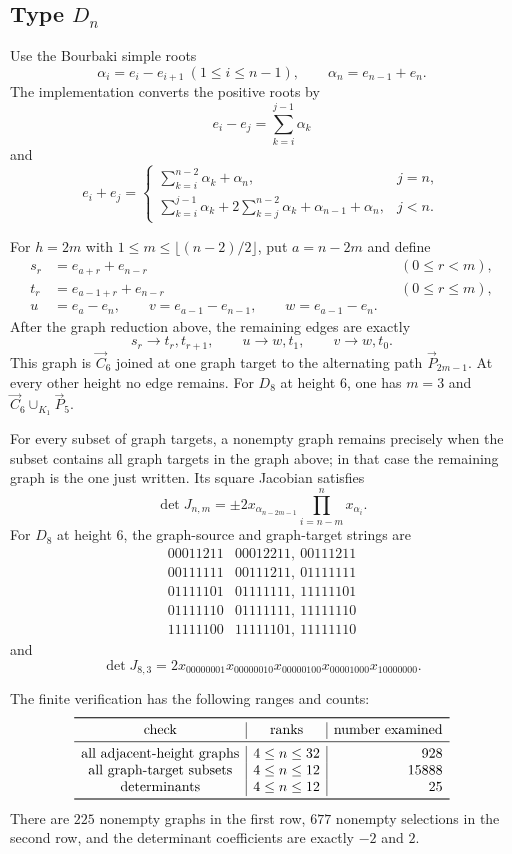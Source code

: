\documentclass[11pt]{amsart}
\begin{document}
\subsection{Type \texorpdfstring{$D_n$}{Dn}}

Use the Bourbaki simple roots
\[
\alpha_i=e_i-e_{i+1}\ (1\le i\le n-1),\qquad
\alpha_n=e_{n-1}+e_n.
\]
The implementation converts the positive roots by
\[
e_i-e_j=\sum_{k=i}^{j-1}\alpha_k
\]
and
\[
e_i+e_j=
\begin{cases}
\displaystyle\sum_{k=i}^{n-2}\alpha_k+\alpha_n,&j=n,\\[4pt]
\displaystyle\sum_{k=i}^{j-1}\alpha_k
+2\sum_{k=j}^{n-2}\alpha_k+\alpha_{n-1}+\alpha_n,&j<n.
\end{cases}
\]

For $h=2m$ with $1\le m\le\lfloor(n-2)/2\rfloor$, put $a=n-2m$ and define
\[
\begin{aligned}
s_r&=e_{a+r}+e_{n-r} &&(0\le r<m),\\
t_r&=e_{a-1+r}+e_{n-r} &&(0\le r\le m),\\
u&=e_a-e_n,\qquad
v=e_{a-1}-e_{n-1},\qquad
w=e_{a-1}-e_n.
\end{aligned}
\]
After the graph reduction above, the remaining edges are exactly
\[
s_r\longrightarrow t_r,t_{r+1},\qquad
u\longrightarrow w,t_1,\qquad
v\longrightarrow w,t_0.
\]
This graph is $\vec C_6$ joined at one graph target to the alternating path
$\vec P_{2m-1}$.  At every other height no edge remains.  For $D_8$ at height
$6$, one has $m=3$ and $\vec C_6\cup_{K_1}\vec P_5$.

For every subset of graph targets, a nonempty graph remains precisely when the
subset contains all graph targets in the graph above; in that case the
remaining graph is the one just written.  Its square Jacobian satisfies
\[
\det J_{n,m}=\pm2x_{\alpha_{n-2m-1}}
\prod_{i=n-m}^{n}x_{\alpha_i}.
\]
For $D_8$ at height $6$, the graph-source and graph-target strings are
\[
\begin{array}{c|c}
00011211&00012211,\ 00111211\\
00111111&00111211,\ 01111111\\
01111101&01111111,\ 11111101\\
01111110&01111111,\ 11111110\\
11111100&11111101,\ 11111110
\end{array}
\]
and
\[
\det J_{8,3}=2x_{00000001}x_{00000010}x_{00000100}
x_{00001000}x_{10000000}.
\]

The finite verification has the following ranges and counts:
\[
\begin{array}{c|c|r}
\toprule
\text{check}&\text{ranks}&\text{number examined}\\
\midrule
\text{all adjacent-height graphs}&4\le n\le32&928\\
\text{all graph-target subsets}&4\le n\le12&15888\\
\text{determinants}&4\le n\le12&25\\
\bottomrule
\end{array}
\]
There are $225$ nonempty graphs in the first row, $677$ nonempty selections in
the second row, and the determinant coefficients are exactly $-2$ and $2$.
\end{document}
